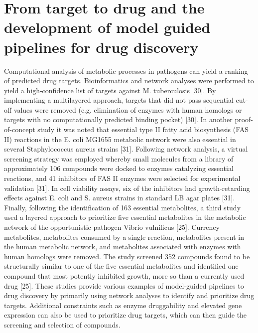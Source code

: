 \section{From target to drug and the development of 
         model guided pipelines for drug discovery}
Computational analysis of metabolic processes in pathogens can 
yield a ranking of predicted drug targets. Bioinformatics and 
network analyses were performed to yield a high-confidence list 
of targets against M. tuberculosis [30]. By implementing a 
multilayered approach, targets that did not pass sequential 
cut-off values were removed (e.g. elimination of enzymes with 
human homologs or targets with no computationally predicted 
binding pocket) [30]. In another proof-of-concept study it 
was noted that essential type II fatty acid biosynthesis (FAS II) 
reactions in the E. coli MG1655 metabolic network were also 
essential in several Staphylococcus aureus strains [31]. Following 
network analysis, a virtual screening strategy was employed 
whereby small molecules from a library of approximately 106 
compounds were docked to enzymes catalyzing essential reactions, 
and 41 inhibitors of FAS II enzymes were selected for experimental 
validation [31]. In cell viability assays, six of the inhibitors 
had growth-retarding effects against E. coli and S. aureus 
strains in standard LB agar plates [31]. Finally, following 
the identification of 163 essential metabolites, a third study 
used a layered approach to prioritize five essential metabolites 
in the metabolic network of the opportunistic pathogen Vibrio 
vulnificus [25]. Currency metabolites, metabolites consumed by 
a single reaction, metabolites present in the human metabolic 
network, and metabolites associated with enzymes with human 
homologs were removed. The study screened 352 compounds found 
to be structurally similar to one of the five essential metabolites 
and identified one compound that most potently inhibited growth, 
more so than a currently used drug [25]. These studies provide 
various examples of model-guided pipelines to drug discovery by 
primarily using network analyses to identify and prioritize drug 
targets. Additional constraints such as enzyme druggability and 
elevated gene expression can also be used to prioritize drug 
targets, which can then guide the screening and selection of compounds.

